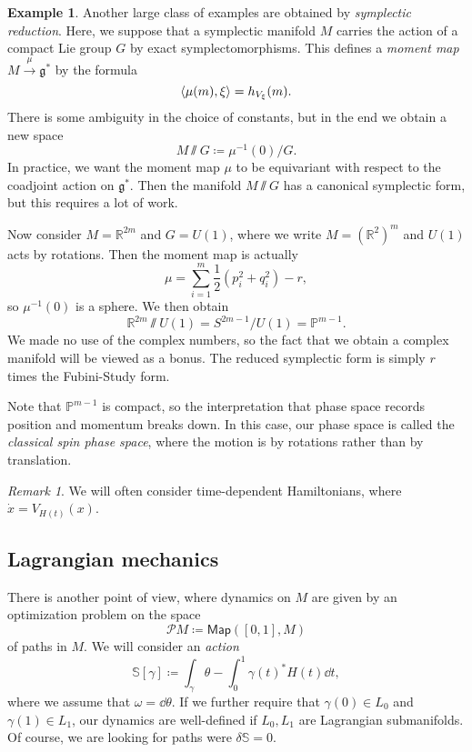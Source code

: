 \documentclass[leqno, openany]{memoir}
\theoremstyle{definition}
\newtheorem{exm}[thm]{Example}
\theoremstyle{remark}
\newtheorem{rmk}[thm]{Remark}
\theoremstyle{plain}
\theoremstyle{definition}
\theoremstyle{remark}
\newcommand{\R}{\mathbb{R}}
\renewcommand{\P}{\mathbb{P}}
\newcommand{\g}{\mathfrak{g}}
\newcommand{\mc}[1]{\mathcal{#1}}
\newcommand{\ms}[1]{\mathsf{#1}}
\begin{document}
\begin{exm}
  Another large class of examples are obtained by \textit{symplectic reduction}. Here, we suppose that a symplectic manifold $M$ carries the action of a compact Lie group $G$ by exact symplectomorphisms. This defines a \textit{moment map} $M \xrightarrow{\mu} \g^*$ by the formula
  \[ \ev{\mu(m), \xi} = h_{V_{\xi}}(m). \]
  There is some ambiguity in the choice of constants, but in the end we obtain a new space
  \[ M \sslash G \coloneqq \mu^{-1}(0) / G. \]
  In practice, we want the moment map $\mu$ to be equivariant with respect to the coadjoint action on $\g^*$. Then the manifold $M \sslash G$ has a canonical symplectic form, but this requires a lot of work.

  Now consider $M = \R^{2m}$ and $G = U(1)$, where we write $M = (\R^2)^m$ and $U(1)$ acts by rotations. Then the moment map is actually
  \[ \mu = \sum_{i=1}^m \frac{1}{2} (p_i^2 + q_i^2) - r, \]
  so $\mu^{-1}(0)$ is a sphere. We then obtain
  \[ \R^{2m} \sslash U(1) = S^{2m-1}/U(1) = \P^{m-1}. \]
  We made no use of the complex numbers, so the fact that we obtain a complex manifold will be viewed as a bonus. The reduced symplectic form is simply $r$ times the Fubini-Study form.

  Note that $\P^{m-1}$ is compact, so the interpretation that phase space records position and momentum breaks down. In this case, our phase space is called the \textit{classical spin phase space}, where the motion is by rotations rather than by translation.
\end{exm}

\begin{rmk}
  We will often consider time-dependent Hamiltonians, where $\dot{x} = V_{H(t)}(x)$.
\end{rmk}

\subsection{Lagrangian mechanics}
\label{subsec:lagrangian}

There is another point of view, where dynamics on $M$ are given by an optimization problem on the space
\[ \mc{P}M \coloneqq \ms{Map}([0,1], M) \]
of paths in $M$. We will consider an \textit{action}
\[ \mathbb{S}[\gamma] \coloneqq \int_{\gamma} \theta - \int_0^1 \gamma(t)^* H(t) \dd{t}, \]
where we assume that $\omega = \dd{\theta}$. If we further require that $\gamma(0) \in L_0$ and $\gamma(1) \in L_1$, our dynamics are well-defined if $L_0, L_1$ are Lagrangian submanifolds. Of course, we are looking for paths were $\delta \mathbb{S} = 0$.
\end{document}
